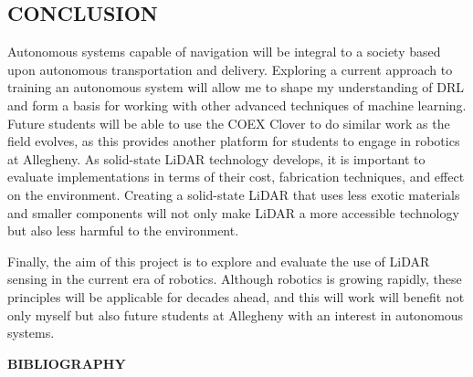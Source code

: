 \documentclass[12pt]{article}
\begin{document}
\subsection*{CONCLUSION}

Autonomous systems capable of navigation will be integral to a society based upon autonomous transportation and delivery.
Exploring a current approach to training an autonomous system will allow me to shape my understanding of DRL and form a basis for working with other advanced techniques of machine learning.
Future students will be able to use the COEX Clover to do similar work as the field evolves, as this provides another platform for students to engage in robotics at Allegheny.
As solid-state LiDAR technology develops, it is important to evaluate implementations in terms of their cost, fabrication techniques, and effect on the environment.
Creating a solid-state LiDAR that uses less exotic materials and smaller components will not only make LiDAR a more accessible technology but also less harmful to the environment.

Finally, the aim of this project is to explore and evaluate the use of LiDAR sensing in the current era of robotics.
Although robotics is growing rapidly, these principles will be applicable for decades ahead, and this will work will benefit not only myself but also future students at Allegheny with an interest in autonomous systems.

\nocite{*}
\newpage

\begin{center}\small{\textbf{BIBLIOGRAPHY}}\end{center}

\printbibliography[heading=none]
\end{document}
